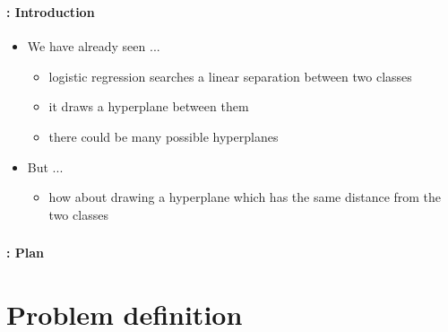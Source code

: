 \documentclass[xcolor=table]{beamer}
\subtitle[SVM]{Support vector machine (SVM)}
\begin{document}
	
\begin{frame}
	\frametitle{\inserttitle}
	\framesubtitle{\insertshortsubtitle: Introduction}
	
	\begin{itemize}
		\item We have already seen ...
		\begin{itemize}
			\item logistic regression searches a linear separation between two classes
			\item it draws a hyperplane between them
			\item there could be many possible hyperplanes
		\end{itemize}
		\item But ...
		\begin{itemize}
			\item how about drawing a hyperplane which has the same distance from the two classes
		\end{itemize}

	\end{itemize}
\end{frame}


\begin{frame}
	\frametitle{\inserttitle}
	\framesubtitle{\insertshortsubtitle: Plan}
	
	\begin{multicols}{2}
		\tableofcontents
	\end{multicols}
\end{frame}

\section{Problem definition}
\end{document}

